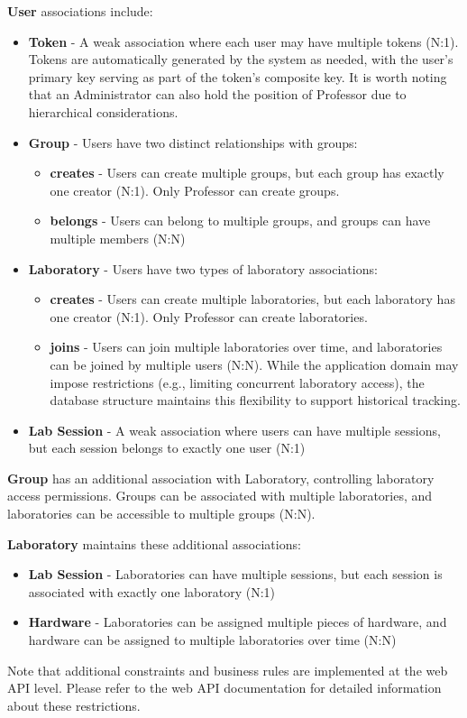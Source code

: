 \textbf{User} associations include:
\begin{itemize}
    \item \textbf{Token} - A weak association where each user may have multiple tokens (N:1). Tokens are automatically generated by the system as needed, with the user's primary key serving as part of the token's composite key.
    It is worth noting that an Administrator can also hold the position of Professor due to hierarchical considerations.    \item \textbf{Group} - Users have two distinct relationships with groups:
    \begin{itemize}
        \item \textbf{creates} - Users can create multiple groups, but each group has exactly one creator (N:1). Only Professor can create groups.
        \item \textbf{belongs} - Users can belong to multiple groups, and groups can have multiple members (N:N)
    \end{itemize}
    \item \textbf{Laboratory} - Users have two types of laboratory associations:
    \begin{itemize}
        \item \textbf{creates} - Users can create multiple laboratories, but each laboratory has one creator (N:1). Only Professor can create laboratories.
        \item \textbf{joins} - Users can join multiple laboratories over time, and laboratories can be joined by multiple users (N:N). While the application domain may impose restrictions (e.g., limiting concurrent laboratory access), the database structure maintains this flexibility to support historical tracking.
    \end{itemize}
    \item \textbf{Lab Session} - A weak association where users can have multiple sessions, but each session belongs to exactly one user (N:1)
\end{itemize}

\textbf{Group} has an additional association with Laboratory, controlling laboratory access permissions. Groups can be associated with multiple laboratories, and laboratories can be accessible to multiple groups (N:N).

\textbf{Laboratory} maintains these additional associations:
\begin{itemize}
    \item \textbf{Lab Session} - Laboratories can have multiple sessions, but each session is associated with exactly one laboratory (N:1)
    \item \textbf{Hardware} - Laboratories can be assigned multiple pieces of hardware, and hardware can be assigned to multiple laboratories over time (N:N)
\end{itemize}

Note that additional constraints and business rules are implemented at the web API level. Please refer to the web API documentation for detailed information about these restrictions.